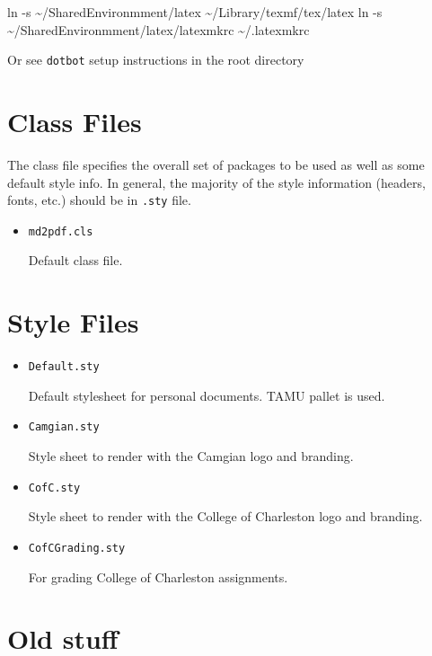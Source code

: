 \documentclass[
]{md2pdf}
\newenvironment{Shaded}{}{}
\newcommand{\NormalTok}[1]{#1}
\begin{document}
\begin{Shaded}
\begin{Highlighting}[]
\NormalTok{ln {-}s \textasciitilde{}/SharedEnvironmment/latex \textasciitilde{}/Library/texmf/tex/latex}
\NormalTok{ln {-}s \textasciitilde{}/SharedEnvironmment/latex/latexmkrc \textasciitilde{}/.latexmkrc}
\end{Highlighting}
\end{Shaded}

Or see \texttt{dotbot} setup instructions in the root directory

\hypertarget{class-files}{%
\section{Class Files}\label{class-files}}

The class file specifies the overall set of packages to be used as well
as some default style info. In general, the majority of the style
information (headers, fonts, etc.) should be in \texttt{.sty} file.

\begin{itemize}
\item
  \texttt{md2pdf.cls}

  Default class file.
\end{itemize}

\hypertarget{style-files}{%
\section{Style Files}\label{style-files}}

\begin{itemize}
\item
  \texttt{Default.sty}

  Default stylesheet for personal documents. TAMU pallet is used.
\item
  \texttt{Camgian.sty}

  Style sheet to render with the Camgian logo and branding.
\item
  \texttt{CofC.sty}

  Style sheet to render with the College of Charleston logo and
  branding.
\item
  \texttt{CofCGrading.sty}

  For grading College of Charleston assignments.
\end{itemize}

\hypertarget{old-stuff}{%
\section{Old stuff}\label{old-stuff}}
\end{document}
